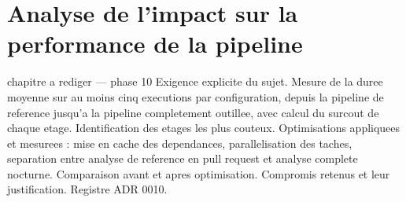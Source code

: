 ﻿%
\chapter{Analyse de l'impact sur la performance de la pipeline}
\label{chap:performance}

\begin{constat}{chapitre a rediger --- phase 10}
Exigence explicite du sujet. Mesure de la duree moyenne sur au moins cinq executions par configuration, depuis la pipeline de reference jusqu'a la pipeline completement outillee, avec calcul du surcout de chaque etage. Identification des etages les plus couteux. Optimisations appliquees et mesurees : mise en cache des dependances, parallelisation des taches, separation entre analyse de reference en pull request et analyse complete nocturne. Comparaison avant et apres optimisation. Compromis retenus et leur justification. Registre ADR 0010.
\end{constat}
